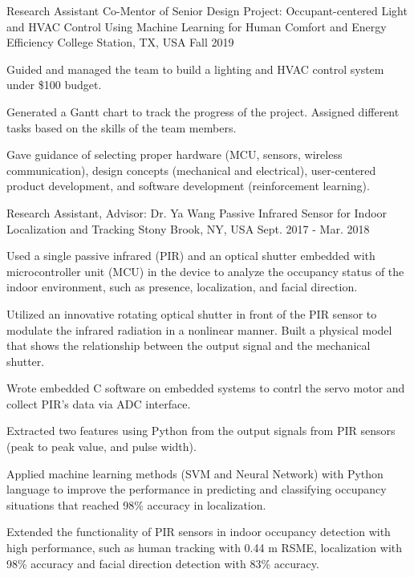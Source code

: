 \begin{cventries}
  \cventry
    {Research Assistant} %
    {Co-Mentor of Senior Design Project: Occupant-centered Light and HVAC Control Using Machine Learning for Human Comfort and Energy Efficiency} %
    {College Station, TX, USA} %
    {Fall 2019} %
    {
      \begin{cvitems} %
        \item Guided and managed the team to build a lighting and HVAC control system under \$100 budget. 
        \item Generated a Gantt chart to track the progress of the project. Assigned different tasks based on the skills of the team members.
        \item Gave guidance of selecting proper hardware (MCU, sensors, wireless communication), design concepts (mechanical and electrical), user-centered product development, and software development (reinforcement learning).
      \end{cvitems}
    }

\cventry
{Research Assistant, Advisor: Dr. Ya Wang} %
{Passive Infrared Sensor for Indoor Localization and Tracking} %
{Stony Brook, NY, USA} %
{Sept. 2017 - Mar. 2018} %
{
  \begin{cvitems} %
    \item Used a single passive infrared (PIR) and an optical shutter embedded with microcontroller unit (MCU) in the device to analyze the occupancy status of the indoor environment, such as presence, localization, and facial direction. 
    \item Utilized an innovative rotating optical shutter in front of the PIR sensor to modulate the infrared radiation in a nonlinear manner. Built a physical model that shows the relationship between the output signal and the mechanical shutter.
    \item Wrote embedded C software on embedded systems to contrl the servo motor and collect PIR's data via ADC interface.
    \item Extracted two features using Python from the output signals from PIR sensors (peak to peak value, and pulse width). 
    \item Applied machine learning methods (SVM and Neural Network) with Python language to improve the performance in predicting and classifying occupancy situations that reached 98\% accuracy in localization.  
    \item Extended the functionality of PIR sensors in indoor occupancy detection with high performance, such as human tracking with 0.44 m RSME, localization with 98\% accuracy and facial direction detection with 83\% accuracy. 
  \end{cvitems}
}


\end{cventries}
